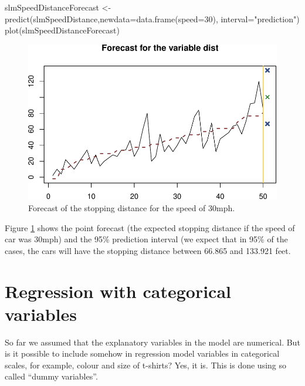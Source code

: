 \documentclass[
]{book}
\newenvironment{Shaded}{\begin{snugshade}}{\end{snugshade}}
\newcommand{\AttributeTok}[1]{\textcolor[rgb]{0.77,0.63,0.00}{#1}}
\newcommand{\DecValTok}[1]{\textcolor[rgb]{0.00,0.00,0.81}{#1}}
\newcommand{\FunctionTok}[1]{\textcolor[rgb]{0.00,0.00,0.00}{#1}}
\newcommand{\NormalTok}[1]{#1}
\newcommand{\OtherTok}[1]{\textcolor[rgb]{0.56,0.35,0.01}{#1}}
\newcommand{\StringTok}[1]{\textcolor[rgb]{0.31,0.60,0.02}{#1}}
\theoremstyle{definition}
\theoremstyle{definition}
\theoremstyle{definition}
\theoremstyle{definition}
\theoremstyle{remark}
\begin{document}
\begin{Shaded}
\begin{Highlighting}[]
\NormalTok{slmSpeedDistanceForecast }\OtherTok{\textless{}{-}} \FunctionTok{predict}\NormalTok{(slmSpeedDistance,}\AttributeTok{newdata=}\FunctionTok{data.frame}\NormalTok{(}\AttributeTok{speed=}\DecValTok{30}\NormalTok{),}
                                    \AttributeTok{interval=}\StringTok{"prediction"}\NormalTok{)}
\FunctionTok{plot}\NormalTok{(slmSpeedDistanceForecast)}
\end{Highlighting}
\end{Shaded}

\begin{figure}
\centering
\includegraphics{Svetunkov---Statistics-for-Business-Analytics_files/figure-latex/speedDistanceForecast-1.pdf}
\caption{\label{fig:speedDistanceForecast}Forecast of the stopping distance for the speed of 30mph.}
\end{figure}

Figure \ref{fig:speedDistanceForecast} shows the point forecast (the expected stopping distance if the speed of car was 30mph) and the 95\% prediction interval (we expect that in 95\% of the cases, the cars will have the stopping distance between 66.865 and 133.921 feet.

\hypertarget{dummyVariables}{%
\chapter{Regression with categorical variables}\label{dummyVariables}}

So far we assumed that the explanatory variables in the model are numerical. But is it possible to include somehow in regression model variables in categorical scales, for example, colour and size of t-shirts? Yes, it is. This is done using so called ``dummy variables''.
\end{document}
